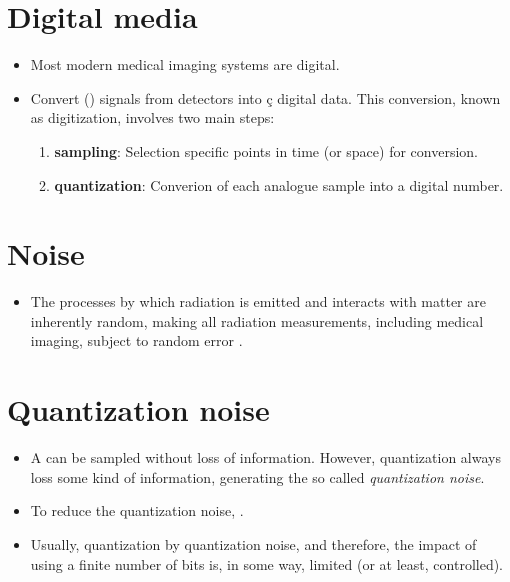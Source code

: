 \section{Digital media}
\begin{itemize}
\item Most modern medical imaging systems are digital.
\item Convert  () signals from detectors into
ç  digital data. This conversion, known as digitization, involves two
  main steps:
  \begin{enumerate}
  \item \textbf{sampling}: Selection specific points in time (or
    space) for conversion.
  \item \textbf{quantization}: Converion of each analogue sample into a
    digital number.
  \end{enumerate}
\end{itemize}

\section{Noise}
\begin{itemize}
\item The processes by which radiation is emitted and interacts with
  matter are inherently random, making all radiation measurements,
  including medical imaging, subject to random error
  \cite{bushberg2011essential}.
\end{itemize}

\section{Quantization noise}
\begin{itemize}
\item A  can be sampled without
  loss of information. However, quantization always loss some kind of
  information, generating the so called \emph{quantization noise}.
\item To reduce the quantization noise,  \cite{bushberg2011essential}.
\item Usually, quantization  by quantization noise, and therefore,
  the impact of using a finite number of bits is, in some way, limited
  (or at least, controlled).
\end{itemize}